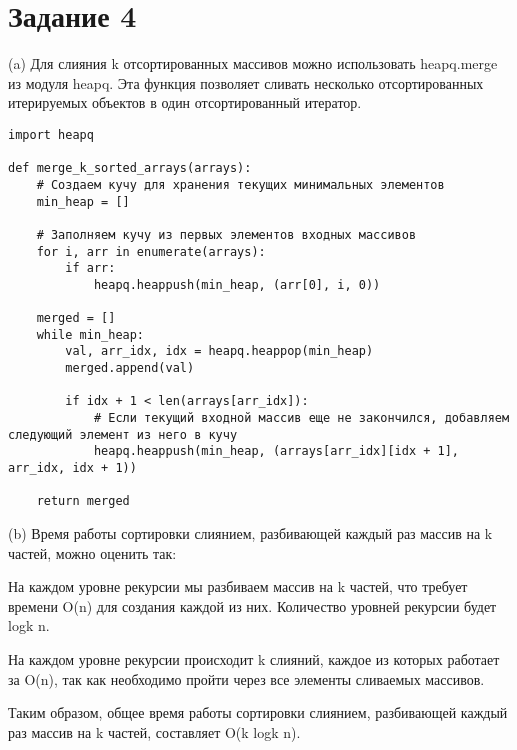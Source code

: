 \section*{Задание 4}



(a) Для слияния k отсортированных массивов можно использовать heapq.merge из модуля heapq. Эта функция позволяет сливать несколько отсортированных итерируемых объектов в один отсортированный итератор.
\begin{verbatim}
import heapq

def merge_k_sorted_arrays(arrays):
    # Создаем кучу для хранения текущих минимальных элементов
    min_heap = []
    
    # Заполняем кучу из первых элементов входных массивов
    for i, arr in enumerate(arrays):
        if arr:
            heapq.heappush(min_heap, (arr[0], i, 0))
    
    merged = []
    while min_heap:
        val, arr_idx, idx = heapq.heappop(min_heap)
        merged.append(val)
        
        if idx + 1 < len(arrays[arr_idx]):
            # Если текущий входной массив еще не закончился, добавляем следующий элемент из него в кучу
            heapq.heappush(min_heap, (arrays[arr_idx][idx + 1], arr_idx, idx + 1))
    
    return merged
\end{verbatim}

(b) Время работы сортировки слиянием, разбивающей каждый раз массив на k частей, можно оценить так:

На каждом уровне рекурсии мы разбиваем массив на k частей, что требует времени O(n) для создания каждой из них. Количество уровней рекурсии будет logk n.

На каждом уровне рекурсии происходит k слияний, каждое из которых работает за O(n), так как необходимо пройти через все элементы сливаемых массивов.

Таким образом, общее время работы сортировки слиянием, разбивающей каждый раз массив на k частей, составляет O(k logk n).
